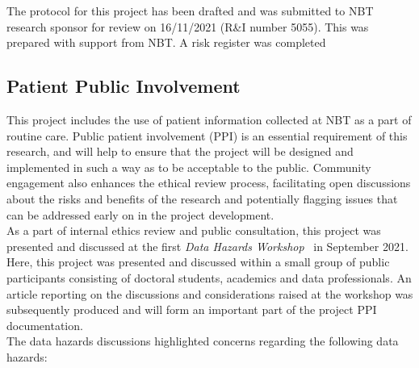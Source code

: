 \documentclass{article}
\begin{document}
The protocol for this project has been drafted and was submitted to
NBT research sponsor for review on 16/11/2021 (R\&I number 5055). This was prepared with
support from NBT. A risk register was completed

\subsection{Patient Public Involvement}

This project includes the use of patient information collected at NBT as a part
of routine care. Public patient involvement (PPI) is an essential
requirement of this research, and will help to ensure that the project
will be designed and implemented in such a way as to be acceptable to
the public. Community engagement also enhances the ethical
review process, facilitating open discussions about the risks and
benefits of the research and potentially flagging issues that can be
addressed early on in the project development.\\

As a part of internal ethics review and public consultation, this
project was presented and discussed at the first \textit{Data Hazards
  Workshop}~\cite{data-hazards-workshop} in September 2021. Here, this
project was presented and discussed within a small group of public
participants consisting of doctoral students, academics and data
professionals. An article
reporting on the discussions and considerations raised at the
workshop was subsequently produced and will form an important part of
the project PPI documentation.\\

The data hazards discussions highlighted concerns regarding the
following data hazards:
\end{document}
